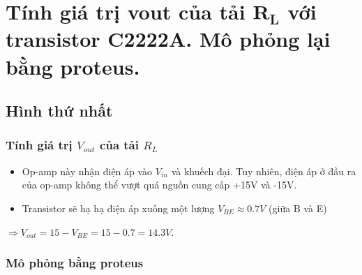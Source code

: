 \section{Tính giá trị vout của tải $\mathbf{R_L}$ với transistor C2222A. Mô phỏng lại bằng proteus.}
    \subsection{Hình thứ nhất}
        \subsubsection{Tính giá trị $V_{out}$ của tải $R_L$}
            \begin{itemize}
                \item Op-amp này nhận điện áp vào $V_{in}$ và khuếch đại. Tuy nhiên, điện áp ở đầu ra của op-amp không thể vượt quá nguồn cung cấp +15V và -15V.
                \item Transistor sẽ hạ hạ điện áp xuống một lượng $V_{BE} \approx 0.7V$ (giữa B và E) 
            \end{itemize}
            $\Rightarrow V_{out} = 15 - V_{BE} = 15 - 0.7 = 14.3V$.
        \subsubsection{Mô phỏng bằng proteus}